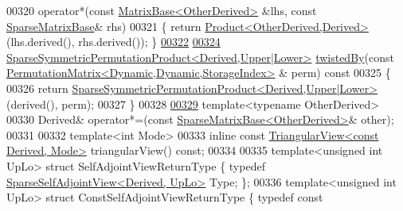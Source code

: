 \begin{DoxyCode}
00320     operator*(\textcolor{keyword}{const} \hyperlink{group___core___module_class_eigen_1_1_matrix_base}{MatrixBase<OtherDerived>} &lhs, \textcolor{keyword}{const} 
      \hyperlink{group___sparse_core___module_class_eigen_1_1_sparse_matrix_base}{SparseMatrixBase}& rhs)
00321     \{ \textcolor{keywordflow}{return} \hyperlink{group___core___module_class_eigen_1_1_product}{Product<OtherDerived,Derived>}(lhs.derived(), rhs.derived()); \}
\hyperlink{group___sparse_core___module_a68d2c2489e2f434ad062384eb224ea85}{00322}     
\hyperlink{group___sparse_core___module_a51d4898bd6a57cc3ba543a39b102423e}{00324}     \hyperlink{class_eigen_1_1_sparse_symmetric_permutation_product}{SparseSymmetricPermutationProduct<Derived,Upper|Lower>}
       \hyperlink{group___sparse_core___module_a51d4898bd6a57cc3ba543a39b102423e}{twistedBy}(\textcolor{keyword}{const} \hyperlink{group___core___module}{PermutationMatrix<Dynamic,Dynamic,StorageIndex>}
      & perm)\textcolor{keyword}{ const}
00325 \textcolor{keyword}{    }\{
00326       \textcolor{keywordflow}{return} \hyperlink{class_eigen_1_1_sparse_symmetric_permutation_product}{SparseSymmetricPermutationProduct<Derived,Upper|Lower>}
      (derived(), perm);
00327     \}
00328 
\hyperlink{group___sparse_core___module_a752c59896582b0c654d24362f3799b68}{00329}     \textcolor{keyword}{template}<\textcolor{keyword}{typename} OtherDerived>
00330     Derived& operator*=(\textcolor{keyword}{const} \hyperlink{group___sparse_core___module_class_eigen_1_1_sparse_matrix_base}{SparseMatrixBase<OtherDerived>}& other);
00331 
00332     \textcolor{keyword}{template}<\textcolor{keywordtype}{int} Mode>
00333     \textcolor{keyword}{inline} \textcolor{keyword}{const} \hyperlink{group___core___module_class_eigen_1_1_triangular_view}{TriangularView<const Derived, Mode>} triangularView() \textcolor{keyword}{
      const};
00334     
00335     \textcolor{keyword}{template}<\textcolor{keywordtype}{unsigned} \textcolor{keywordtype}{int} UpLo> \textcolor{keyword}{struct }SelfAdjointViewReturnType \{ \textcolor{keyword}{typedef} 
      \hyperlink{group___sparse_core___module_class_eigen_1_1_sparse_self_adjoint_view}{SparseSelfAdjointView<Derived, UpLo>} Type; \};
00336     \textcolor{keyword}{template}<\textcolor{keywordtype}{unsigned} \textcolor{keywordtype}{int} UpLo> \textcolor{keyword}{struct }ConstSelfAdjointViewReturnType \{ \textcolor{keyword}{typedef} \textcolor{keyword}{const} 

\end{DoxyCode}
